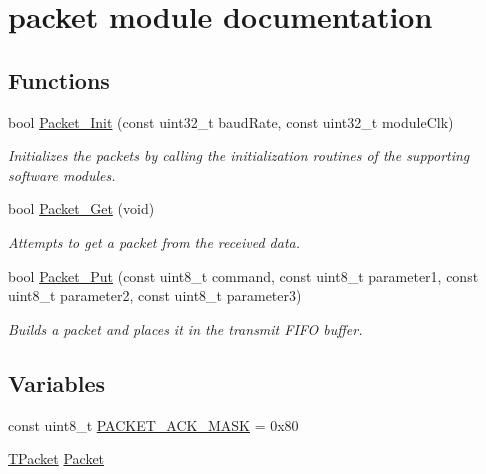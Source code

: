\hypertarget{group__packet__module}{}\section{packet module documentation}
\label{group__packet__module}
\subsection*{Functions}
\begin{DoxyCompactItemize}
\item 
bool \hyperlink{group__packet__module_ga414aa3f521fdfd6e4586d98a946b6ab2}{Packet\+\_\+\+Init} (const uint32\+\_\+t baud\+Rate, const uint32\+\_\+t module\+Clk)
\begin{DoxyCompactList}\small\item\em Initializes the packets by calling the initialization routines of the supporting software modules. \end{DoxyCompactList}\item 
bool \hyperlink{group__packet__module_gac58a17928cd5e556e1567b2fde9f88f0}{Packet\+\_\+\+Get} (void)
\begin{DoxyCompactList}\small\item\em Attempts to get a packet from the received data. \end{DoxyCompactList}\item 
bool \hyperlink{group__packet__module_ga431a1e1da25a8214a502ec81f88fc3f1}{Packet\+\_\+\+Put} (const uint8\+\_\+t command, const uint8\+\_\+t parameter1, const uint8\+\_\+t parameter2, const uint8\+\_\+t parameter3)
\begin{DoxyCompactList}\small\item\em Builds a packet and places it in the transmit F\+I\+F\+O buffer. \end{DoxyCompactList}\end{DoxyCompactItemize}
\subsection*{Variables}
\begin{DoxyCompactItemize}
\item 
const uint8\+\_\+t \hyperlink{group__packet__module_ga5faca24c448374dc4656ebc31afcae0b}{P\+A\+C\+K\+E\+T\+\_\+\+A\+C\+K\+\_\+\+M\+A\+S\+K} = 0x80
\item 
\hyperlink{union_t_packet}{T\+Packet} \hyperlink{group__packet__module_gac74c1cf77ae5807a61baefd6df20201e}{Packet}
\end{DoxyCompactItemize}


